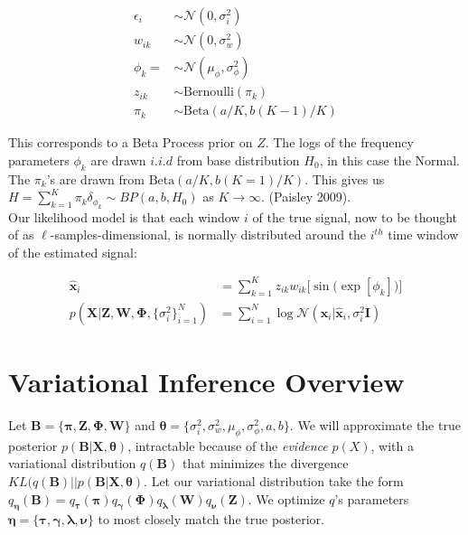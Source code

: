 \documentclass[11pt]{article}
\theoremstyle{definition}
\theoremstyle{plain}
\newcommand{\Beta}{\text{Beta}}
\newcommand{\Bernoulli}{\text{Bernoulli}}
\begin{document}
\begin{align*}
    \epsilon_i &\sim \mathcal{N}(0, \sigma^2_i)\\
    w_{ik} &\sim \mathcal{N}(0, \sigma^2_w)\\
    \phi_k = &\sim \mathcal{N}(\mu_{\phi}, \sigma^2_{\phi})\\
    z_{ik} &\sim \Bernoulli(\pi_k)\\
    \pi_k &\sim \Beta(a/K, b(K-1)/K)
\end{align*}

\noindent This corresponds to a Beta Process prior on $Z$. The logs of the frequency parameters 
$\phi_k$ are drawn $i.i.d$ from base distribution $H_0$, in this case the Normal.
The $\pi_k$'s are drawn from $\Beta(a/K,b(K=1)/K)$. This gives us $H = \sum_{k=1}^K \pi_k \delta_{\phi_k} \sim BP(a,b,H_0)$ as $K \rightarrow \infty$. (Paisley 2009).\\

\noindent Our likelihood model is that each window $i$ of the true signal, now to be thought of as $\ell$-samples-dimensional, is normally distributed around the $i^{th}$
time window of the estimated signal:

\begin{align*}
    \hat{\mathbf{x}}_i &= \sum_{k=1}^K z_{ik}w_{ik}\big[\sin\big(\exp[\phi_k]\big)\big]\\
    p(\mathbf{X} |\mathbf{Z}, \mathbf{W}, \boldsymbol{\Phi},\{\sigma^2_i\}_{i=1}^N) &= \sum_{i=1}^N \log \mathcal{N}(\mathbf{x}_i | \hat{\mathbf{x}}_i, \sigma^2_i\mathbf{I})
\end{align*}


\section{Variational Inference Overview}

\noindent Let $\mathbf{B} = \{\boldsymbol{\pi}, \mathbf{Z}, \mathbf{\Phi}, \mathbf{W}\}$ and 
$\boldsymbol{\theta} = \{\sigma^2_i, \sigma^2_w, \mu_{\phi}, \sigma^2_\phi, a, b \}$. 
We will approximate the true posterior $p(\mathbf{B}|\mathbf{X},\boldsymbol{\theta})$, intractable because of the \textit{evidence} $p(X)$,
with a variational distribution $q(\mathbf{B})$ that minimizes the divergence $KL(q(\mathbf{B}) || p(\mathbf{B}|\mathbf{X},\boldsymbol{\theta})$. 
Let our variational distribution take the form $q_{\boldsymbol{\eta}}(\mathbf{B}) = q_{\boldsymbol{\tau}}(\boldsymbol{\pi}) q_{\boldsymbol{\gamma}}(\boldsymbol{\Phi}) 
q_{\boldsymbol{\lambda}}(\mathbf{W}) q_{\boldsymbol{\nu}}(\mathbf{Z})$. We optimize $q$'s parameters $\boldsymbol{\eta} = \{\boldsymbol{\tau}, \boldsymbol{\gamma}, 
\boldsymbol{\lambda}, \boldsymbol{\nu}\}$ to most closely match the true posterior.\\
\end{document}
